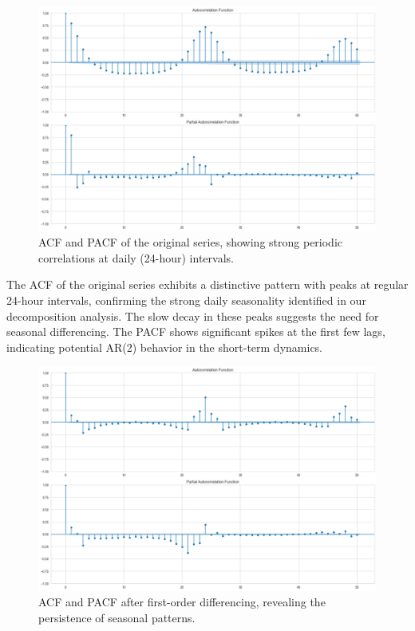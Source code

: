 \documentclass{article}
\begin{document}
\begin{figure}[htbp]
    \centering
    \includegraphics[width=\textwidth]{acf_pacf_original}
    \caption{ACF and PACF of the original series, showing strong periodic correlations at daily (24-hour) intervals.}
    \label{fig:acf_original}
\end{figure}

The ACF of the original series exhibits a distinctive pattern with peaks at regular 24-hour intervals, confirming the strong daily seasonality identified in our decomposition analysis. The slow decay in these peaks suggests the need for seasonal differencing. The PACF shows significant spikes at the first few lags, indicating potential AR(2) behavior in the short-term dynamics.

\begin{figure}[htbp]
    \centering
    \includegraphics[width=\textwidth]{acf_pacf_diff1}
    \caption{ACF and PACF after first-order differencing, revealing the persistence of seasonal patterns.}
    \label{fig:acf_diff1}
\end{figure}
\end{document}
